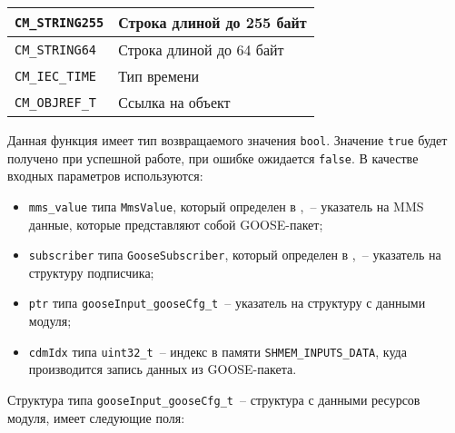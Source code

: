 \begin{table}[ht]
\begin{tabular}{| >{\raggedright}m{}
                    | >{\raggedright\arraybackslash}m{}|}
        \hline
        \lstinline[]$CM_STRING255$ &
        Строка длиной до 255 байт
        \\

        \hline
        \lstinline[]$CM_STRING64$ &
        Строка длиной до 64 байт
        \\

        \hline
        \lstinline[]$CM_IEC_TIME$ &
        Тип времени
        \\

        \hline
        \lstinline[]$CM_OBJREF_T$ &
        Ссылка на объект
        \\

        \hline
    \end{tabular}
\end{table}

Данная функция имеет тип возвращаемого значения \lstinline{bool}. Значение \lstinline{true} будет получено при успешной работе, при ошибке ожидается \lstinline{false}.
В качестве входных параметров используются:

\begin{itemize}
    \item \lstinline{mms_value} типа \lstinline{MmsValue}, который определен в \libIec,~-- указатель на MMS данные, которые представляют собой GOOSE-пакет;
    \item \lstinline{subscriber} типа \lstinline{GooseSubscriber}, который определен в \libIec,~-- указатель на структуру подписчика;
    \item \lstinline{ptr} типа \lstinline{gooseInput_gooseCfg_t}~-- указатель на структуру с данными модуля;
    \item \lstinline{cdmIdx} типа \lstinline{uint32_t}~-- индекс в памяти \lstinline{SHMEM_INPUTS_DATA}, куда производится запись данных из GOOSE-пакета.
\end{itemize}

Структура типа \lstinline{gooseInput_gooseCfg_t}~-- структура с данными ресурсов модуля, имеет следующие поля:

